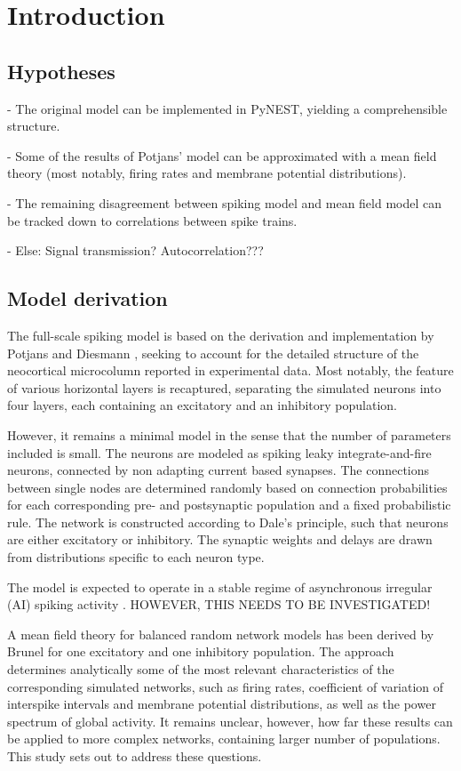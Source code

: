 \section{Introduction}
\label{sec:intro}
\subsection{Hypotheses}
- The original model can be implemented in PyNEST\cite{NEST}, yielding a 
comprehensible structure.

- Some of the results of Potjans' model can be approximated with a 
mean field theory (most notably, firing rates and membrane potential
distributions).

- The remaining disagreement between spiking model and mean field 
model can be tracked down to correlations between spike trains.

- Else: Signal transmission? Autocorrelation???

\subsection{Model derivation}
The full-scale spiking model is based on the derivation and implementation 
by Potjans and Diesmann \cite{potjans2014}, seeking to account for the detailed 
structure of the neocortical microcolumn reported in experimental data. 
Most notably, the feature of various horizontal layers is recaptured, 
separating the simulated neurons into four layers, each containing an 
excitatory and an inhibitory population. 


However, it remains a minimal model in the sense that the number of 
parameters included is small. The neurons are modeled as spiking leaky 
integrate-and-fire neurons, connected by non adapting current based synapses. 
The connections between single nodes are determined randomly based on 
connection probabilities for each corresponding pre- and postsynaptic 
population and a fixed probabilistic rule. The network is constructed 
according to Dale's principle, such that neurons are either
excitatory or inhibitory. The synaptic weights and delays are drawn
from distributions specific to each neuron type. 


The model is expected to operate in a stable regime of asynchronous irregular 
(AI) spiking activity \cite{brunel2000}. HOWEVER, THIS NEEDS TO BE INVESTIGATED!

A mean field theory for balanced random network models has been derived by 
Brunel \cite{brunel2000} for one excitatory and one inhibitory population. 
The approach determines analytically some of the most relevant characteristics
of the corresponding simulated networks, such as firing rates, coefficient 
of variation of interspike intervals and membrane potential distributions, 
as well as the power spectrum of global activity. It remains unclear, however, 
how far these results can be applied to more complex networks, containing 
larger number of populations. This study sets out to address these questions. 

